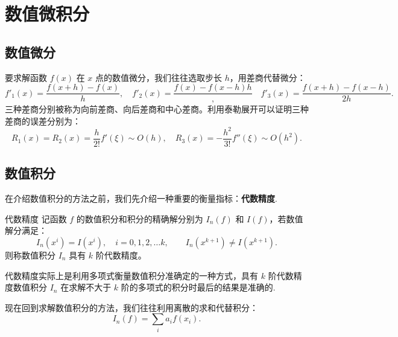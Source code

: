 \chapter{数值微积分}
\section{数值微分}
要求解函数 $f(x)$ 在 $x$ 点的数值微分，我们往往选取步长 $h$，用差商代替微分：
\[
    f'_1(x) = \dfrac{f(x+h)-f(x)}{h},\quad f'_2(x) = \dfrac{f(x)-f(x-h){h}},\quad f'_3(x) = \dfrac{f(x+h)-f(x-h)}{2h}.
\]
三种差商分别被称为向前差商、向后差商和中心差商。利用泰勒展开可以证明三种差商的误差分别为：
\[
    R_1(x) = R_2(x) = \dfrac{h}{2!}f'(\xi) \sim O(h),\quad R_3 (x) = -\dfrac{h^2}{3!}f''(\xi)\sim O(h^2).
\]

\section{数值积分}
在介绍数值积分的方法之前，我们先介绍一种重要的衡量指标：{\bf 代数精度}.
\begin{definition}{代数精度}
    记函数 $f$ 的数值积分和积分的精确解分别为 $I_n(f)$ 和 $I(f)$，若数值解分满足：
    \[
        I_n(x^i) = I(x^i),\quad i = 0,1,2,\dots k,\qquad I_n(x^{k+1})\neq I(x^{k+1}).
    \]
    则称数值积分 $I_n$ 具有 $k$ 阶代数精度。
\end{definition}
代数精度实际上是利用多项式衡量数值积分准确定的一种方式，具有 $k$ 阶代数精度数值积分 $I_n$ 在求解不大于 $k$ 阶的多项式的积分时最后的结果是准确的.

现在回到求解数值积分的方法，我们往往利用离散的求和代替积分：
\[
    I_n(f) = \sum_i a_if(x_i).
\]